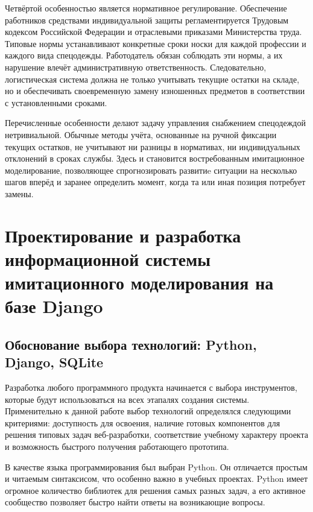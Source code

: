 \documentclass[14pt,a4paper]{extreport}
\begin{document}
\begin{singlespacing}
	Четвёртой особенностью является нормативное регулирование. Обеспечение работников средствами индивидуальной защиты регламентируется Трудовым кодексом Российской Федерации и отраслевыми приказами Министерства труда. Типовые нормы устанавливают конкретные сроки носки для каждой профессии и каждого вида спецодежды. Работодатель обязан соблюдать эти нормы, а их нарушение влечёт административную ответственность. Следовательно, логистическая система должна не только учитывать текущие остатки на складе, но и обеспечивать своевременную замену изношенных предметов в соответствии с установленными сроками.
	
	Перечисленные особенности делают задачу управления снабжением спецодеждой нетривиальной. Обычные методы учёта, основанные на ручной фиксации текущих остатков, не учитывают ни разницы в нормативах, ни индивидуальных отклонений в сроках службы. Здесь и становится востребованным имитационное моделирование, позволяющее спрогнозировать развитиe ситуации на несколько шагов вперёд и заранее определить момент, когда та или иная позиция потребует замены.
	
	\newpage
	
	\chapter[Глава \thechapter. Проектирование и разработка информационной системы имитационного моделирования на базе Django]{Проектирование и разработка информационной системы имитационного моделирования на базе Django}
\section{Обоснование выбора технологий: Python, Django, SQLite}

Разработка любого программного продукта начинается с выбора инструментов, которые будут использоваться на всех этапалях создания системы. Применительно к данной работе выбор технологий определялся следующими критериями: доступность для освоения, наличие готовых компонентов для решения типовых задач веб-разработки, соответствие учебному характеру проекта и возможность быстрого получения работающего прототипа.

В качестве языка программирования был выбран Python. Он отличается простым и читаемым синтаксисом, что особенно важно в учебных проектах. Python имеет огромное количество библиотек для решения самых разных задач, а его активное сообщество позволяет быстро найти ответы на возникающие вопросы.


\end{singlespacing}
\end{document}
